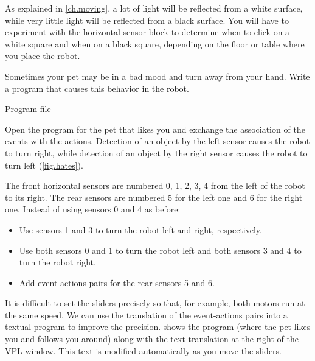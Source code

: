 \newpage

As explained in \cref{ch.moving}, a lot of light will be reflected from
a white surface, while very little light will be reflected from a black
surface. You will have to experiment with the horizontal sensor block to
determine when to click on a white square and when on a black square,
depending on the floor or table where you place the robot.



Sometimes your pet may be in a bad mood and turn away from your hand.
Write a program that causes this behavior in the robot.

{\raggedleft \hfill Program file }

Open the program for the pet that likes you and exchange the association
of the events with the actions. Detection of an object by the left
sensor causes the robot to turn right, while detection of an object by
the right sensor causes the robot to turn left (\cref{fig.hates}).


 { The front horizontal sensors are numbered
0, 1, 2, 3, 4 from the left of the robot to its right. The rear sensors
are numbered 5 for the left one and 6 for the right one. Instead of
using sensors 0 and 4 as before:
\begin{itemize}[noitemsep,nosep,leftmargin=*]
\item Use sensors 1 and 3 to turn the robot left and right, respectively.
\item Use both sensors 0 and 1 to turn the robot left and both sensors 3
and 4 to turn the robot right.
\item Add event-actions pairs for the rear sensors 5 and 6.
\end{itemize}
}

\label{s.sliders}

It is difficult to set the sliders precisely so that, for example, both
motors run at the same speed. We can use the translation of the
event-actions pairs into a textual program to improve the precision.
 shows the program (where the pet likes you and
follows you around) along with the text translation at the right of the
VPL window. This text is modified automatically as you move the sliders.

